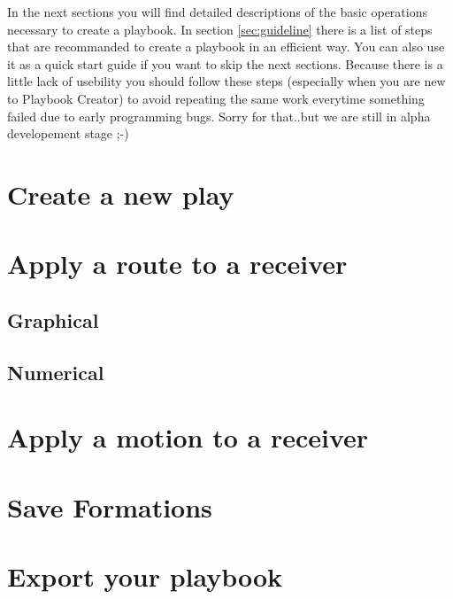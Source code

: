 \documentclass[10pt,a4paper]{article}
\begin{document}
		In the next sections you will find detailed descriptions of the basic operations necessary to create a playbook. In section \ref{sec:guideline} there is a list of steps that are recommanded to create a playbook in an efficient way. You can also use it as a quick start guide if you want to skip the next sections. Because there is a little lack of usebility you should follow these steps (especially when you are new to Playbook Creator) to avoid repeating the same work everytime something failed due to early programming bugs.
		Sorry for that..but we are still in alpha developement stage ;-)
	\clearpage
	\section{Create a new play}
	\section{Apply a route to a receiver}
	\label{sec:routes}
		\subsection{Graphical}
		\subsection{Numerical}
	\section{Apply a motion to a receiver}
	\label{sec:motions}
	\section{Save Formations}
	\section{Export your playbook}
	\label{sec:pdfExport}
	\clearpage
\end{document}
